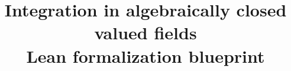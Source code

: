 \theoremstyle{definition}
\newtheorem{theorem}{Theorem}
\newtheorem{definition}[theorem]{Definition}
\newtheorem{lemma}[theorem]{Lemma}
\newtheorem{proposition}[theorem]{Proposition}
\newtheorem{corollary}[theorem]{Corollary}
\newtheorem{remark}[theorem]{Remark}
\newtheorem{assumption}[theorem]{External hypothesis}
\newtheorem{checkedimport}[theorem]{Checked Lean import}
\newcommand{\rv}{\operatorname{rv}}
\newcommand{\repoFile}[2]{\href{https://github.com/daviddhilbert/integration-in-ACVF/blob/644f8dbedaf12726f00e082c7f68ec6734d12c6e/#1}{#2}}
\title{Integration in algebraically closed valued fields\\\large Lean formalization blueprint}
\author{}
\date{}

